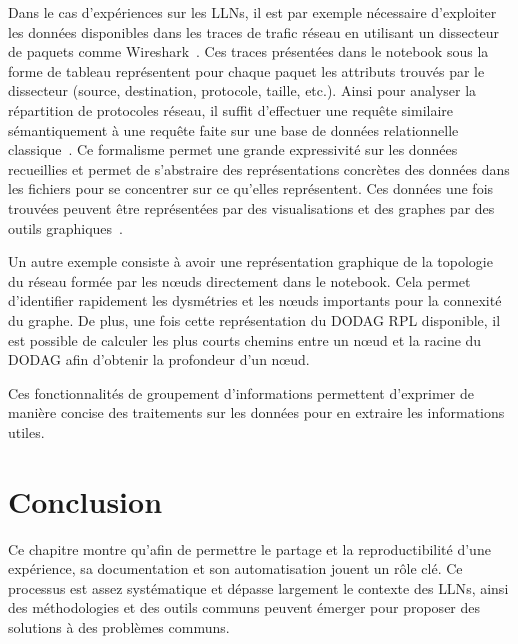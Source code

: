 Dans le cas d'expériences sur les \ac{LLN}s, il est par exemple nécessaire d'exploiter les données disponibles dans les traces de trafic réseau en utilisant un dissecteur de paquets comme Wireshark~\cite{tshark}.
Ces traces présentées dans le notebook sous la forme de tableau représentent pour chaque paquet les attributs trouvés par le dissecteur (source, destination, protocole, taille, etc.).
Ainsi pour analyser la répartition de protocoles réseau, il suffit d'effectuer une requête similaire sémantiquement à une requête faite sur une base de données relationnelle classique~\cite{mckinney2012python}.
Ce formalisme permet une grande expressivité sur les données recueillies et permet de s'abstraire des représentations concrètes des données dans les fichiers pour se concentrer sur ce qu'elles représentent.
Ces données une fois trouvées peuvent être représentées par des visualisations et des graphes par des outils graphiques~\cite{Hunter:2007}.

Un autre exemple consiste à avoir une représentation graphique de la topologie du réseau formée par les nœuds directement dans le notebook.
Cela permet d'identifier rapidement les dysmétries et les nœuds importants pour la connexité du graphe.
De plus, une fois cette représentation du \ac{DODAG} \ac{RPL} disponible, il est possible de calculer les plus courts chemins entre un nœud et la racine du \ac{DODAG} afin d'obtenir la profondeur d'un nœud.

Ces fonctionnalités de groupement d'informations permettent d'exprimer de manière concise des traitements sur les données pour en extraire les informations utiles.

\section{Conclusion} 
\label{makesense:conclusion}

Ce chapitre montre qu'afin de permettre le partage et la reproductibilité d'une expérience, sa documentation et son automatisation jouent un rôle clé.
Ce processus est assez systématique et dépasse largement le contexte des \ac{LLN}s, ainsi des méthodologies et des outils communs peuvent émerger pour proposer des solutions à des problèmes communs.

